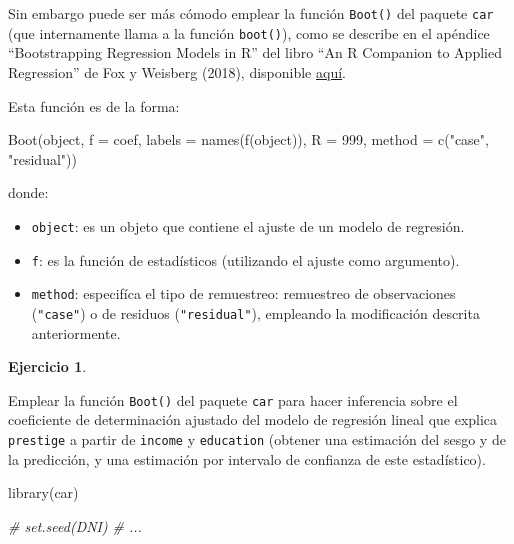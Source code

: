 \documentclass[
]{book}
\newenvironment{Shaded}{\begin{snugshade}}{\end{snugshade}}
\newcommand{\AttributeTok}[1]{\textcolor[rgb]{0.77,0.63,0.00}{#1}}
\newcommand{\CommentTok}[1]{\textcolor[rgb]{0.56,0.35,0.01}{\textit{#1}}}
\newcommand{\DecValTok}[1]{\textcolor[rgb]{0.00,0.00,0.81}{#1}}
\newcommand{\FunctionTok}[1]{\textcolor[rgb]{0.00,0.00,0.00}{#1}}
\newcommand{\NormalTok}[1]{#1}
\newcommand{\StringTok}[1]{\textcolor[rgb]{0.31,0.60,0.02}{#1}}
\theoremstyle{break}
\theoremstyle{definition}
\theoremstyle{definition}
\theoremstyle{definition}
\newtheorem{exercise}{Ejercicio}[chapter]
\theoremstyle{definition}
\theoremstyle{remark}
\begin{document}
Sin embargo puede ser más cómodo emplear la función \texttt{Boot()} del paquete \texttt{car} (que internamente llama a la función \texttt{boot()}),
como se describe en el apéndice ``Bootstrapping Regression Models in R'' del libro ``An R Companion to Applied Regression'' de Fox y Weisberg (2018), disponible \href{https://socialsciences.mcmaster.ca/jfox/Books/Companion/appendices/Appendix-Bootstrapping.pdf}{aquí}.

Esta función es de la forma:

\begin{Shaded}
\begin{Highlighting}[]
\FunctionTok{Boot}\NormalTok{(object, }\AttributeTok{f =}\NormalTok{ coef, }\AttributeTok{labels =} \FunctionTok{names}\NormalTok{(}\FunctionTok{f}\NormalTok{(object)), }\AttributeTok{R =} \DecValTok{999}\NormalTok{, }
     \AttributeTok{method =} \FunctionTok{c}\NormalTok{(}\StringTok{"case"}\NormalTok{, }\StringTok{"residual"}\NormalTok{))}
\end{Highlighting}
\end{Shaded}

donde:

\begin{itemize}
\item
  \texttt{object}: es un objeto que contiene el ajuste de un modelo de regresión.
\item
  \texttt{f}: es la función de estadísticos (utilizando el ajuste como argumento).
\item
  \texttt{method}: especifíca el tipo de remuestreo: remuestreo de observaciones (\texttt{"case"})
  o de residuos (\texttt{"residual"}), empleando la modificación descrita anteriormente.
\end{itemize}

\begin{exercise}
\protect\hypertarget{exr:boot-car}{}{\label{exr:boot-car} }
\end{exercise}
Emplear la función \texttt{Boot()} del paquete \texttt{car} para hacer inferencia sobre
el coeficiente de determinación ajustado del modelo de regresión lineal
que explica \texttt{prestige} a partir de \texttt{income} y \texttt{education}
(obtener una estimación del sesgo y de la predicción,
y una estimación por intervalo de confianza de este estadístico).

\begin{Shaded}
\begin{Highlighting}[]
\FunctionTok{library}\NormalTok{(car)}

\CommentTok{\# set.seed(DNI)}
\CommentTok{\# ...}
\end{Highlighting}
\end{Shaded}
\end{document}

